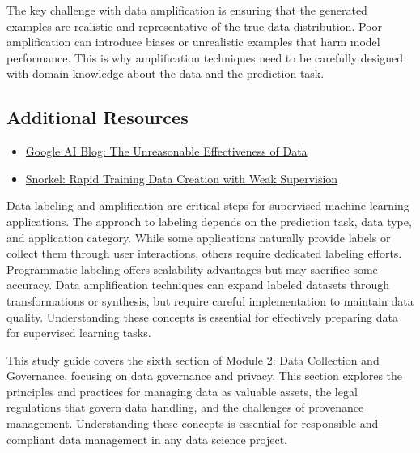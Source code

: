 \documentclass[12pt]{article}
\begin{document}
\begin{enumerate}
\begin{tcolorbox}[colback=blue!5!white,colframe=blue!75!black,title={Solution}]
    The key challenge with data amplification is ensuring that the generated examples are realistic and representative of the true data distribution. Poor amplification can introduce biases or unrealistic examples that harm model performance. This is why amplification techniques need to be carefully designed with domain knowledge about the data and the prediction task.
    \end{tcolorbox}
\end{enumerate}

\subsection{Additional Resources}

\begin{itemize}
    \item \href{https://ai.googleblog.com/2017/07/revisiting-unreasonable-effectiveness.html}{Google AI Blog: The Unreasonable Effectiveness of Data}
    \item \href{http://cidrdb.org/cidr2019/papers/p58-ratner-cidr19.pdf}{Snorkel: Rapid Training Data Creation with Weak Supervision}
\end{itemize}

\begin{tcolorbox}[colback=red!5!white,colframe=red!75!black,title={Key Takeaway}]
Data labeling and amplification are critical steps for supervised machine learning applications. The approach to labeling depends on the prediction task, data type, and application category. While some applications naturally provide labels or collect them through user interactions, others require dedicated labeling efforts. Programmatic labeling offers scalability advantages but may sacrifice some accuracy. Data amplification techniques can expand labeled datasets through transformations or synthesis, but require careful implementation to maintain data quality. Understanding these concepts is essential for effectively preparing data for supervised learning tasks.
\end{tcolorbox}

\newpage

\begin{tcolorbox}[colback=blue!5!white,colframe=blue!75!black,title={Section 6: Data Governance and Privacy}]
This study guide covers the sixth section of Module 2: Data Collection and Governance, focusing on data governance and privacy. This section explores the principles and practices for managing data as valuable assets, the legal regulations that govern data handling, and the challenges of provenance management. Understanding these concepts is essential for responsible and compliant data management in any data science project.
\end{tcolorbox}
\end{document}
